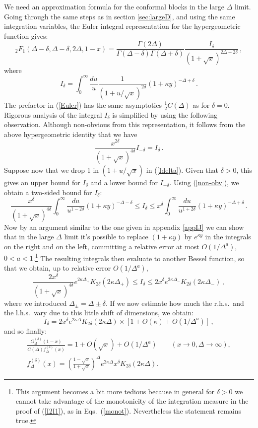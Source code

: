 \documentclass[12pt]{article}
\newcommand{\reef}[1]{(\ref{#1})}
\newcommand{\beq}{\begin{equation}}
\newcommand{\eeq}{\end{equation}}
\def\half{{\textstyle\frac 12}}
\def\le{\leqslant}
\newcommand{\D}{\Delta}
\numberwithin{equation}{section}
\begin{document}
We need an approximation formula for the conformal blocks in the large $\Delta$ limit.
Going through the same steps as in section \ref{sec:largeD}, and using the same integration variables, the Euler integral representation for the hypergeometric function gives:
\beq
\label{Euler}
{}_2F_{1}(\D-\delta,\D-\delta,2\D,1-x)= 
\frac{\Gamma(2\Delta)}{\Gamma(\D-\delta) \Gamma(\D+\delta)} 
\frac{I_\delta}{(1+\sqrt{x})^{2\D-2\delta}}\,,
\eeq
where
\beq
\label{Idelta}
I_\delta=\int_0^\infty \frac{du}{u}\frac{1}{(1+u/\sqrt{x})^{2\delta} }(1+\kappa y)^{-\D+\delta}\,.
\eeq
The prefactor in \reef{Euler} has the same asymptotics $\half C(\D)$ as for $\delta=0$.
Rigorous analysis of the integral $I_\delta$ is simplified by using the following observation. Although non-obvious from this representation, it follows from the above hypergeometric identity that we have
 \beq
 \label{non-obv}
 \frac{x^{2\delta}}{(1+\sqrt{x})^{4\delta}}I_{-\delta} = I_{\delta}\,.
\eeq
Suppose now that we drop 1 in $(1+u/\sqrt{x})$ in \reef{Idelta}. Given that $\delta>0$, this gives an upper bound for $I_\delta$ and a lower bound for $I_{-\delta}$. Using \reef{non-obv}, we obtain a two-sided bound for $I_\delta$:
\beq
\frac{x^{\delta}}{(1+\sqrt{x})^{4\delta}} \int_0^\infty \frac{du}{u^{1-2\delta}}(1+\kappa y)^{-\D-\delta} \le  I_\delta \le  
{x^\delta} \int_0^\infty \frac{du}{u^{1+2\delta}}(1+\kappa y)^{-\D+\delta}\,.
 \eeq
Now by an argument similar to the one given in appendix \ref{appIJ} we can show that in the large $\Delta$ limit it's possible to replace $(1+\kappa y)$ by $e^{\kappa y}$ in the integrals on the right and on the left, committing a relative error at most $O(1/\Delta^{a})$, $0<a<1$.\footnote{This argument becomes a bit more tedious because in general for $\delta>0$ we cannot take advantage of the monotonicity of the integration measure in the proof of \reef{I2I1}, as in Eqs.~\reef{monot}. Nevertheless the statement remains true.} The resulting integrals then evaluate to another Bessel function, so that we obtain, up to relative error $O(1/\Delta^{a})$,
\beq
\frac{2x^{\delta}}{(1+\sqrt{x})^{4\delta}}  e^{2\kappa \D_+} K_{2\delta}(2\kappa \D_+) \le  I_\delta \le  2x^\delta  e^{2\kappa \D_-} K_{2\delta}(2\kappa \D_-)\,,
\eeq
where we introduced $\Delta_\pm=\Delta\pm\delta$. If we now estimate how much the r.h.s.~and the l.h.s.~vary due to this little shift of dimensions, we obtain:
\beq 
I_\delta = 2x^\delta  e^{2\kappa \D } K_{2\delta}(2\kappa \D)\times[1+O(\kappa)+O(1/\Delta^{a})]\,,
\eeq
and so finally:
\begin{gather}
 \label{largeDeltaAsdelta}
\frac{G^{(\delta)}_\D(1-x)}{C(\D)  f^{(\delta)}_\Delta(x)} = 1+O(\sqrt{x})+O(1/\Delta^{a}) \qquad(x\to0,\D\to \infty),\\
\label{fDdelta}
f^{(\delta)}_\D(x) = \left ( \frac{1-\sqrt{x}}{1+\sqrt{x}} \right ) ^\Delta 
e^{2\kappa\D} x^\delta  K_{2\delta}(2\kappa\Delta).
\end{gather}
\end{document}
